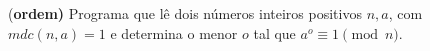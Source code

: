\item{(\bf ordem)}
		Programa que lê dois números inteiros positivos $n,a$, com $mdc(n,a)=1$ e determina o menor $o$ tal que $a^o\equiv 1 \pmod{n}$.
